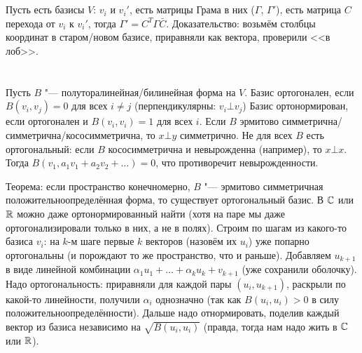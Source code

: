 \section{} %
Пусть есть базисы $V$: $v_i$ и $v_i'$, есть матрицы Грама в них ($\Gamma$, $\Gamma'$), есть матрица $C$ перехода от $v_i$ к $v_i'$,
тогда $\Gamma'=C^T\Gamma\bar C$.
Доказательство: возьмём столбцы координат в старом/новом базисе, приравняли как вектора, проверили <<в лоб>>.

\section{} %
Пусть $B$  "--- полуторалинейная/билинейная форма на $V$.
Базис ортогонален, если $B(v_i, v_j)=0$ для всех $i \neq j$ (перпендикулярны: $v_i \bot v_j$)
Базис ортонормирован, если ортогонален и $B(v_i, v_i)=1$ для всех $i$.
Если $B$ эрмитово симметрична/симметрична/кососимметрична, то $x \bot y$ симметрично.
Не для всех $B$ есть ортогональный: если $B$ кососимметрична и невырожденна (например), то $x \bot x$.
Тогда $B(v_1, a_1v_1+a_2v_2+\dots)=0$, что противоречит невырожденности.

Теорема: если пространство конечномерно, $B$ "--- эрмитово симметричная положительноопределённая форма, то существует ортогональный базис.
В $\mathbb{C}$ или $\mathbb{R}$ можно даже ортонормированный найти (хотя на паре мы даже ортогонализировали только в них, а не в полях).
Строим по шагам из какого-то базиса $v_i$: на $k$-м шаге первые $k$ векторов (назовём их $u_i$) уже попарно ортогональны (и порождают то же пространство, что и раньше).
Добавляем $u_{k+1}$ в виде линейной комбинации $\alpha_1u_1 + \dots + \alpha_ku_k + v_{k+1}$ (уже сохранили оболочку).
Надо ортогональность: приравняли для каждой пары $(u_i, u_{k+1})$, раскрыли по какой-то линейности, получили $\alpha_i$ однозначно (так как $B(u_i, u_i)>0$ в силу положительноопределённости).
Дальше надо отнормировать, поделив каждый вектор из базиса независимо на $\sqrt{B(u_i,u_i)}$ (правда, тогда нам надо жить в $\mathbb{C}$ или $\mathbb{R}$).
